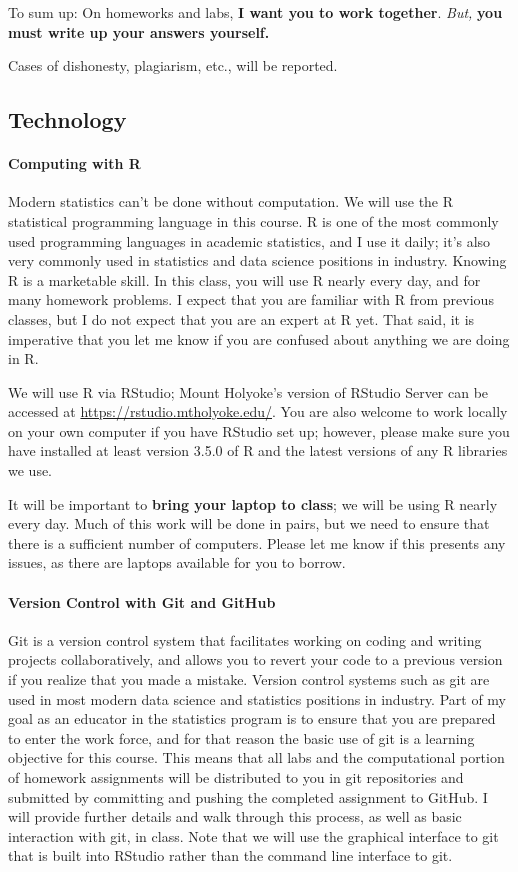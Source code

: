 \documentclass[11pt]{article}
\begin{document}
To sum up: On homeworks and labs, \textbf{I want you to work together}.  \emph{But,} \textbf{you must write up your answers yourself.}

Cases of dishonesty, plagiarism, etc., will be reported.

\subsection*{Technology}

\paragraph{Computing with R}

Modern statistics can't be done without computation.  We will use the R statistical programming language in this course.  R is one of the most commonly used programming languages in academic statistics, and I use it daily; it's also very commonly used in statistics and data science positions in industry.  Knowing R is a marketable skill.  In this class, you will use R nearly every day, and for many homework problems.  I expect that you are familiar with R from previous classes, but I do not expect that you are an expert at R yet.  That said, it is imperative that you let me know if you are confused about anything we are doing in R.

We will use R via RStudio; Mount Holyoke's version of RStudio Server can be accessed at \url{https://rstudio.mtholyoke.edu/}.  You are also welcome to work locally on your own computer if you have RStudio set up; however, please make sure you have installed at least version 3.5.0 of R and the latest versions of any R libraries we use.

It will be important to \textbf{bring your laptop to class}; we will be using R nearly every day.  Much of this work will be done in pairs, but we need to ensure that there is a sufficient number of computers.  Please let me know if this presents any issues, as there are laptops available for you to borrow.

\paragraph{Version Control with Git and GitHub}

Git is a version control system that facilitates working on coding and writing projects collaboratively, and allows you to revert your code to a previous version if you realize that you made a mistake.  Version control systems such as git are used in most modern data science and statistics positions in industry.  Part of my goal as an educator in the statistics program is to ensure that you are prepared to enter the work force, and for that reason the basic use of git is a learning objective for this course.  This means that all labs and the computational portion of homework assignments will be distributed to you in git repositories and submitted by committing and pushing the completed assignment to GitHub.  I will provide further details and walk through this process, as well as basic interaction with git, in class.  Note that we will use the graphical interface to git that is built into RStudio rather than the command line interface to git.
\end{document}
